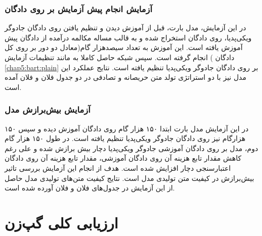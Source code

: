 \subsubsection{آزمایش انجام پیش آزمایش بر روی دادگان
}

در این آزمایش،‌ مدل بارت، قبل از آموزش دیدن و تنظیم یافتن روی دادگان جادوگر ویکی‌‌پدیا، روی دادگان استخراج شده و به قالب مساله مکالمه‌ درآمده از دادگان 
پیش آموزش یافته است. این آموزش به تعداد سیصدهزار گام(معادل دو دور بر روی کل دادگان 
)
انجام گرفته است. سپس شبکه حاصل کاملا به مانند تنظیمات آزمایش
\ref{chap5:bart:plain}
بر روی دادگان جادوگر ویکی‌پدیا تنظیم یافته است. نتایج عملکرد این مدل نیز با دو استراتژی تولد متن حریصانه و تصادفی در دو جدول فلان و فلان آمده است.

\subsubsection{آزمایش بیش‌برازش مدل}
در این آزمایش مدل بارت ابتدا ۱۵۰ هزار گام روی دادگان
آموزش دیده و سپس ۱۵۰ هزارگام نیز روی دادگان جادوگر ویکی‌پدیا تنظیم یافته است. در طول ۱۵۰ هزار گام دوم، مدل بر روی دادگان آموزشی جادوگر ویکی‌پدیا دچار بیش برازش شده و علی رغم کاهش مقدار تابع هزینه آن روی دادگان آموزشی، مقدار تابع هزینه آن روی دادگان اعتبارسنجی دچار افزایش شده است. هدف از انجام این آزمایش بررسی تاثیر بیش‌برازش در کیفیت متن تولیدی مدل است. نتایج کیفیت متن‌های تولیدی مدل حاصل از این آزمایش در جدول‌های فلان و فلان آورده شده است. 


\section{ارزیابی کلی گپ‌زن}
